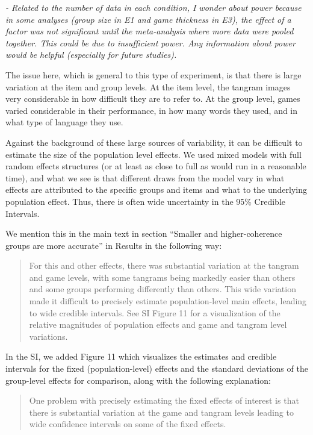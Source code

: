 \documentclass{stanfordletter}
\newcommand{\theysaid}[1]{\begin{leftbar} \noindent 
		\textsl{ #1}\end{leftbar}}
\newcommand{\revised}[1]{\begin{quote}	#1 \end{quote}}
\begin{document}
\begin{letter}{}
          
          \theysaid{- Related to the number of data in each condition, I wonder about power because in some analyses (group size in E1 and game thickness in E3), the effect of a factor was not significant until the meta-analysis where more data were pooled together. This could be due to insufficient power. Any information about power would be helpful (especially for future studies).}
          
          The issue here, which is general to this type of experiment, is that there is large variation at the item and group levels. At the item level, the tangram images very considerable in how difficult they are to refer to. At the group level, games varied considerable in their performance, in how many words they used, and in what type of language they use. 
          
          Against the background of these large sources of variability, it can be difficult to estimate the size of the population level effects. We used mixed models with full random effects structures (or at least as close to full as would run in a reasonable time), and what we see is that different draws from the model vary in what effects are attributed to the specific groups and items and what to the underlying population effect. Thus, there is often wide uncertainty in the 95\% Credible Intervals. 
          
          We mention this in the main text in section ``Smaller and higher-coherence groups are more accurate'' in Results in the following way: 
          \revised{For this and other effects, there was substantial variation at the tangram and game levels, with some tangrams being markedly easier than others and some groups performing differently than others. This wide variation made it difficult to precisely estimate population-level main effects, leading to wide credible intervals. See SI Figure 11 for a visualization of the relative magnitudes of population effects and game and tangram level variations.}
          
          In the SI, we added Figure 11 which visualizes the estimates and credible intervals for the fixed (population-level) effects and the standard deviations of the group-level effects for comparison, along with the following explanation: 
          
          \revised{One problem with precisely estimating the fixed effects of interest is that there is substantial variation at the game and tangram levels leading to wide confidence intervals on some of the fixed effects.
          	
}
\end{letter}
\end{document}
